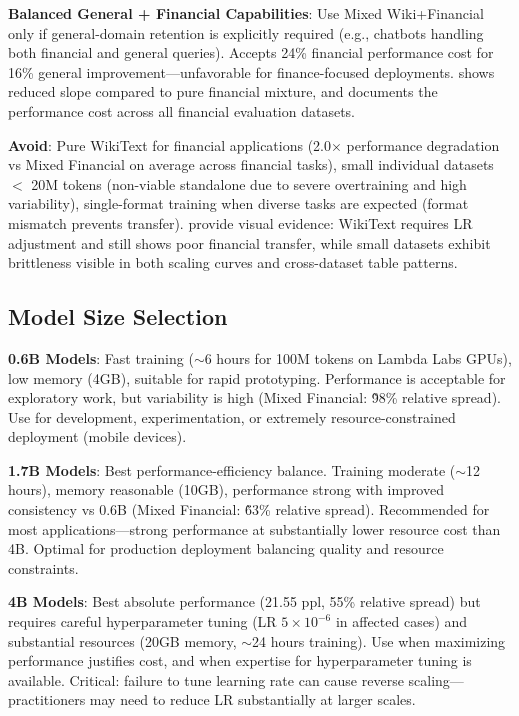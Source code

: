 \textbf{Balanced General + Financial Capabilities}: Use Mixed Wiki+Financial only if general-domain retention is explicitly required (e.g., chatbots handling both financial and general queries). Accepts 24\% financial performance cost for 16\% general improvement—unfavorable for finance-focused deployments.  shows reduced slope compared to pure financial mixture, and  documents the performance cost across all financial evaluation datasets.

\textbf{Avoid}: Pure WikiText for financial applications (2.0$\times$ performance degradation vs Mixed Financial on average across financial tasks), small individual datasets $<$ 20M tokens (non-viable standalone due to severe overtraining and high variability), single-format training when diverse tasks are expected (format mismatch prevents transfer).  provide visual evidence: WikiText requires LR adjustment and still shows poor financial transfer, while small datasets exhibit brittleness visible in both scaling curves and cross-dataset table patterns.

\subsection{Model Size Selection}

\textbf{0.6B Models}: Fast training ($\sim$6 hours for 100M tokens on Lambda Labs GPUs), low memory (4GB), suitable for rapid prototyping. Performance is acceptable for exploratory work, but variability is high (Mixed Financial: \~98\% relative spread). Use for development, experimentation, or extremely resource-constrained deployment (mobile devices).

\textbf{1.7B Models}: Best performance-efficiency balance. Training moderate ($\sim$12 hours), memory reasonable (10GB), performance strong with improved consistency vs 0.6B (Mixed Financial: \~63\% relative spread). Recommended for most applications—strong performance at substantially lower resource cost than 4B. Optimal for production deployment balancing quality and resource constraints.

\textbf{4B Models}: Best absolute performance (21.55 ppl, 55\% relative spread) but requires careful hyperparameter tuning (LR $5 \times 10^{-6}$ in affected cases) and substantial resources (20GB memory, $\sim$24 hours training). Use when maximizing performance justifies cost, and when expertise for hyperparameter tuning is available. Critical: failure to tune learning rate can cause reverse scaling—practitioners may need to reduce LR substantially at larger scales.


